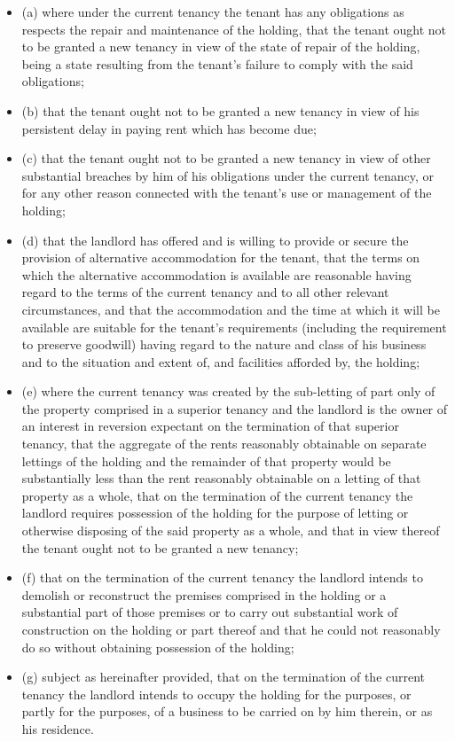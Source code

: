 \documentclass[
]{article}
\providecommand{\tightlist}{%
  \setlength{\itemsep}{0pt}\setlength{\parskip}{0pt}}
\newenvironment{env-2aad614f-6fd6-4025-876c-fcdbeae766fb}
{
    \savenotes\tcolorbox[blanker,breakable,left=5pt,borderline west={2pt}{-4pt}{green}]
}
{
    \endtcolorbox\spewnotes
}
\begin{document}
\begin{env-2aad614f-6fd6-4025-876c-fcdbeae766fb}
\begin{itemize}
\tightlist
\item
  (a) where under the current tenancy the tenant has any obligations as
  respects the repair and maintenance of the holding, that the tenant
  ought not to be granted a new tenancy in view of the state of repair
  of the holding, being a state resulting from the tenant's failure to
  comply with the said obligations;
\item
  (b) that the tenant ought not to be granted a new tenancy in view of
  his persistent delay in paying rent which has become due;
\item
  (c) that the tenant ought not to be granted a new tenancy in view of
  other substantial breaches by him of his obligations under the current
  tenancy, or for any other reason connected with the tenant's use or
  management of the holding;
\item
  (d) that the landlord has offered and is willing to provide or secure
  the provision of alternative accommodation for the tenant, that the
  terms on which the alternative accommodation is available are
  reasonable having regard to the terms of the current tenancy and to
  all other relevant circumstances, and that the accommodation and the
  time at which it will be available are suitable for the tenant's
  requirements (including the requirement to preserve goodwill) having
  regard to the nature and class of his business and to the situation
  and extent of, and facilities afforded by, the holding;
\item
  (e) where the current tenancy was created by the sub-letting of part
  only of the property comprised in a superior tenancy and the landlord
  is the owner of an interest in reversion expectant on the termination
  of that superior tenancy, that the aggregate of the rents reasonably
  obtainable on separate lettings of the holding and the remainder of
  that property would be substantially less than the rent reasonably
  obtainable on a letting of that property as a whole, that on the
  termination of the current tenancy the landlord requires possession of
  the holding for the purpose of letting or otherwise disposing of the
  said property as a whole, and that in view thereof the tenant ought
  not to be granted a new tenancy;
\item
  (f) that on the termination of the current tenancy the landlord
  intends to demolish or reconstruct the premises comprised in the
  holding or a substantial part of those premises or to carry out
  substantial work of construction on the holding or part thereof and
  that he could not reasonably do so without obtaining possession of the
  holding;
\item
  (g) subject as hereinafter provided, that on the termination of the
  current tenancy the landlord intends to occupy the holding for the
  purposes, or partly for the purposes, of a business to be carried on
  by him therein, or as his residence.
\end{itemize}

\end{env-2aad614f-6fd6-4025-876c-fcdbeae766fb}
\end{document}
